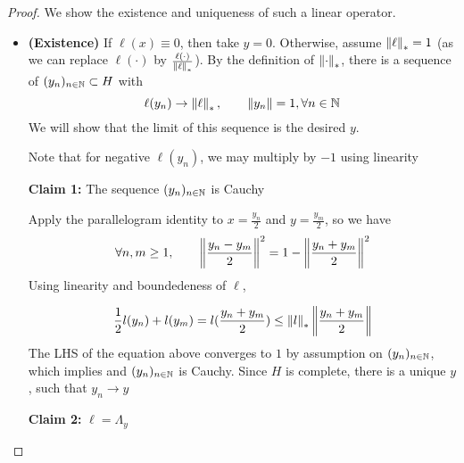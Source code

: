 \documentclass{article}
\begin{document}
\begin{proof}
    We show the existence and uniqueness of such a linear operator.  
    \begin{itemize}
        \item \textbf{(Existence)} If  \(\ell(x)\equiv 0\), then take  \(y=0\). Otherwise, assume  \(\left\|{\ell}\right\|_*=1\) (as we can replace  \(\ell(\cdot)\) by  \(\frac{\ell(\cdot)}{\left\|{\ell}\right\|_*}\)).  
        By the definition of  \(\left\|{\cdot}\right\|_*\), there is a sequence of  \((y_n)_{n\in \mathbb{N}} \subset H\) with  
        \begin{equation*}
            \ell(y_n) \to \left\|{\ell}\right\|_*, \qquad \left\|{y_n}\right\|=1, \forall n \in \mathbb{N}
        \end{equation*}
        We will show that the limit of this sequence is the desired  \(y\).  
\begin{unexaminable}
    Note that for negative $\ell(y_n)$, we may multiply by $-1$ using linearity
\end{unexaminable}
        
        \textbf{Claim 1:} The sequence  \((y_n)_{n \in \mathbb{N}}\) is Cauchy   
        
        Apply the parallelogram identity to  \(x = \frac{y_n}{2}\) and  \(y = \frac{y_m}{2}\), so we have  
        \begin{equation*}
            \forall n,m \geq 1, \qquad \left\|{\frac{y_n-y_m}{2}}\right\|^2=1-\left\|{\frac{y_n+y_m}{2}}\right\|^2
        \end{equation*}  
        Using linearity and boundedeness of  \(\ell\),  

        \begin{equation*}
            \frac{1}{2} l(y_n)+l(y_m) = l(\frac{y_n+y_m}{2}) \leq \left\|{l}\right\|_* \left\|{\frac{y_n+y_m}{2}}\right\|
        \end{equation*}  
        The LHS of the equation above converges to  \(1\) by assumption on  \((y_n)_{n \in \mathbb{N}}\), which implies and  \((y_n)_{n \in \mathbb{N}}\) is Cauchy.  
        Since  \(H\) is complete, there is a unique  \(y\), such that  \(y_n \to y\)  
        
        \textbf{Claim 2:}  \(\ell=\Lambda_y\)  
        

\end{itemize}
\end{proof}
\end{document}
